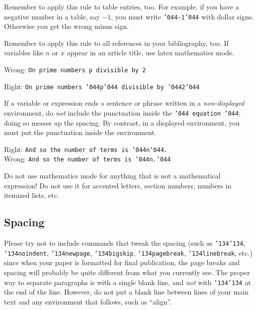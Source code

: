 \documentclass[12pt]{article}
\begin{document}
    Remember to apply this rule to table entries, too.  For example, if
you have a negative number in a table, say $-1$, you must write
{\tt \char'044-1\char'044} with dollar signs.  Otherwise you get the wrong
minus sign.

    Remember to apply this rule to all references in your bibliography, too.
If variables like $n$ or $x$ appear in an article title, use latex
mathematics mode.

\medskip

\noindent Wrong:  {\tt On prime numbers p divisible by 2}

\noindent Right:  {\tt On prime numbers {\char'044p\char'044} divisible by
\char'044{2}\char'044}

\medskip

If a variable or expression ends a sentence or phrase written in 
a {\it non-displayed\/} environment,
do {\it not\/} include the
punctuation inside the {\tt \char'044 equation \char'044};
doing so messes up the spacing.    By contrast, in a displayed
environment, you must put the punctuation inside the environment.

\medskip

\noindent Right:  {\tt And so the number of terms is \char'044n\char'044.} \\
\noindent Wrong:  {\tt And so the number of terms is \char'044n.\char'044} \\

\medskip

Do not use mathematics mode for anything that is not a mathematical expression!
Do not use it for accented letters,
section numbers, numbers in itemized lists, etc.

\subsection{Spacing}

    Please try not to include commands that tweak the spacing (such as
{\tt \char'134\char'134},
{\tt \char'134noindent}, {\tt \char'134newpage},
{\tt \char'134bigskip}, {\tt \char'134pagebreak}, {\tt \char'134linebreak}, 
etc.) since when your paper is formatted for final publication, the page
breaks and spacing will probably be quite different from what you currently
see.    The proper way to separate paragraphs is with a single blank
line, and {\it not\/} with {\tt \char'134\char'134} at the end of the line.
However, do not put a blank line between lines of your main text and
any environment that follows, such as ``align''.
\end{document}
